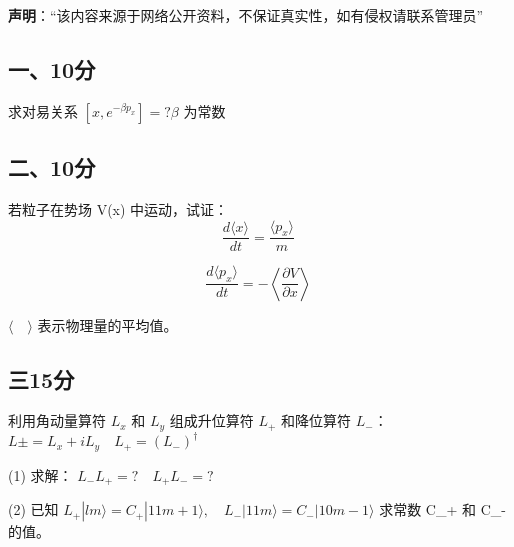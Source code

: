 
\textbf{声明}：“该内容来源于网络公开资料，不保证真实性，如有侵权请联系管理员”

\subsection{一、10分}
求对易关系 $[x, e^{-\beta p_x}] = ? \beta$ 为常数
\subsection{二、10分}
若粒子在势场  V(x) 中运动，试证：
$$\frac{d \langle x \rangle}{dt} = \frac{\langle p_x \rangle}{m}~$$

$$\frac{d \langle p_x \rangle}{dt} = -\left\langle \frac{\partial V}{\partial x} \right\rangle~$$

$\langle \quad \rangle$ 表示物理量的平均值。
\subsection{三15分}
利用角动量算符 $L_x$ 和 $L_y$ 组成升位算符 $L_+$ 和降位算符 $L_-$：
$L\pm = L_x + i L_y \quad L_+ = (L_-)^\dagger$

(1) 求解： $L_- L_+ = ? \quad L_+ L_- = ?$

(2) 已知 $L_+ |l m \rangle = C_+ | 1 1 m + 1 \rangle, \quad L_- | 1 1 m \rangle = C_- | 1 0 m - 1 \rangle$
求常数 C_+ 和 C_- 的值。